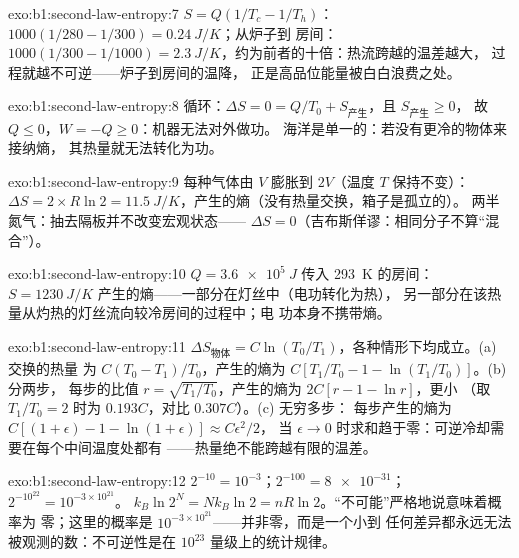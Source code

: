 \begin{solution}{exo:b1:second-law-entropy:7}
$S = Q(1/T_c - 1/T_h)$：$1000(1/280 - 1/300) = \qty{0.24}{J/K}$；从炉子到
房间：$1000(1/300 - 1/1000) = \qty{2.3}{J/K}$，约为前者的十倍：热流跨越的温差越大，
过程就越不可逆——炉子到房间的温降，
正是高品位能量被白白浪费之处。
\end{solution}

\begin{solution}{exo:b1:second-law-entropy:8}
循环：$\Delta S = 0 = Q/T_0 + S_{\text{产生}}$，且 $S_{\text{产生}} \geq 0$，
故 $Q \leq 0$，$W = -Q \geq 0$：机器无法对外做功。
海洋是单一的：若没有更冷的物体来接纳熵，
其热量就无法转化为功。
\end{solution}

\begin{solution}{exo:b1:second-law-entropy:9}
每种气体由 $V$ 膨胀到 $2V$（温度 $T$ 保持不变）：$\Delta S = 2 \times R\ln2
= \qty{11.5}{J/K}$，产生的熵（没有热量交换，箱子是孤立的）。
两半氮气：抽去隔板并不改变宏观状态——
$\Delta S = 0$（吉布斯佯谬：相同分子不算“混合”）。
\end{solution}

\begin{solution}{exo:b1:second-law-entropy:10}
$Q = \qty{3.6e5}{J}$ 传入 \qty{293}{K} 的房间：$S = \qty{1230}{J/K}$
产生的熵——一部分在灯丝中（电功转化为热），
另一部分在该热量从灼热的灯丝流向较冷房间的过程中；电
功本身不携带熵。
\end{solution}

\begin{solution}{exo:b1:second-law-entropy:11}
$\Delta S_{\text{物体}} = C\ln(T_0/T_1)$，各种情形下均成立。(a) 交换的热量
为 $C(T_0 - T_1)/T_0$，产生的熵为 $C[T_1/T_0 - 1 - \ln(T_1/T_0)]$。(b) 分两步，
每步的比值 $r = \sqrt{T_1/T_0}$，产生的熵为 $2C[r - 1 - \ln r]$，更小
（取 $T_1/T_0 = 2$ 时为 $0.193C$，对比 $0.307C$）。(c) 无穷多步：
每步产生的熵为 $C[(1 + \epsilon) - 1 - \ln(1 + \epsilon)] \approx C\epsilon^2/2$，
当 $\epsilon \to 0$ 时求和趋于零：可逆冷却需要在每个中间温度处都有
——热量绝不能跨越有限的温差。
\end{solution}

\begin{solution}{exo:b1:second-law-entropy:12}
$2^{-10} = 10^{-3}$；$2^{-100} = \num{8e-31}$；$2^{-10^{22}} = 10^{-3\times10^{21}}$。
$k_B\ln2^N = Nk_B\ln2 = nR\ln2$。“不可能”严格地说意味着概率为
零；这里的概率是 $10^{-3\times10^{21}}$——并非零，而是一个小到
任何差异都永远无法被观测的数：不可逆性是在
$10^{23}$ 量级上的统计规律。
\end{solution}

